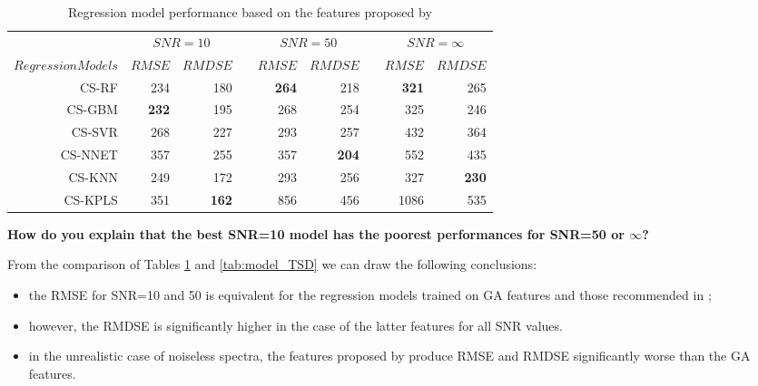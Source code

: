 \begin{table}\centering
{}
\begin{tabular}{@{}rrrcrrcrr@{}}\toprule
& \multicolumn{2}{c}{$SNR = 10$} & \phantom{ab}& \multicolumn{2}{c}{$SNR = 50$} &
\phantom{ab} & \multicolumn{2}{c}{$SNR = \infty$}\\
\cmidrule{2-3} \cmidrule{5-6} \cmidrule{8-9}
$Regression Models$ & $RMSE$ & $RMDSE$ && $RMSE$ & $RMDSE$ && $RMSE$ & $RMDSE$ \\ \midrule
CS-RF               & 234       & 180       && {\bf 264} & 218       &&  {\bf 321} & 265 \\
CS-GBM              & {\bf 232} & 195       && 268       & 254       &&  325       & 246 \\
CS-SVR              & 268       & 227       && 293       & 257       &&  432       & 364 \\
CS-NNET             & 357       & 255       && 357       & {\bf 204} &&  552       & 435 \\
CS-KNN              & 249       & 172       && 293       & 256       &&  327       & {\bf 230}\\
CS-KPLS             & 351       & {\bf 162} && 856       & 456       && 1086       & 535 \\
\hline
\end{tabular}
\caption {Regression model performance based on the features proposed by \cite{cesetti}} 
\label{tab:tab_CS_Model}
\end{table}

{\bf How do you explain that the best SNR=10 model has the poorest
  performances for SNR=50 or $\infty$?}

From the comparison of Tables \ref{tab:tab_CS_Model} and
\ref{tab:model_TSD} we can draw the following conclusions:

\begin{itemize}
\item the RMSE for SNR=10 and 50 is equivalent for the regression
  models trained on GA features and those recommended in
  \cite{cesetti};
  \item however, the RMDSE is significantly higher in the case of the
    latter features for all SNR values.
    \item in the unrealistic case of noiseless spectra, the features
      proposed by \cite{cesetti} produce RMSE and RMDSE significantly
      worse than the GA features.
\end{itemize}

